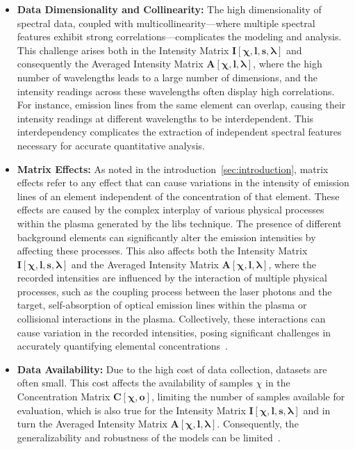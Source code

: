 \begin{itemize}
    \item \textbf{Data Dimensionality and Collinearity:} The high dimensionality of spectral data, coupled with multicollinearity—where multiple spectral features exhibit strong correlations—complicates the modeling and analysis. 
    This challenge arises both in the Intensity Matrix $\mathbf{I[\chi, l, s, \lambda]}$ and consequently the Averaged Intensity Matrix $\mathbf{A[\chi, l, \lambda]}$, where the high number of wavelengths leads to a large number of dimensions, and the intensity readings across these wavelengths often display high correlations.
    For instance, emission lines from the same element can overlap, causing their intensity readings at different wavelengths to be interdependent\cite{andersonImprovedAccuracyQuantitative2017}. 
    This interdependency complicates the extraction of independent spectral features necessary for accurate quantitative analysis.

    \item \textbf{Matrix Effects:} As noted in the introduction~\ref{sec:introduction}, matrix effects refer to any effect that can cause variations in the intensity of emission lines of an element independent of the concentration of that element. 
    These effects are caused by the complex interplay of various physical processes within the plasma generated by the \gls{libs} technique. The presence of different background elements can significantly alter the emission intensities by affecting these processes.
    This also affects both the Intensity Matrix $\mathbf{I[\chi, l, s, \lambda]}$ and the Averaged Intensity Matrix $\mathbf{A[\chi, l, \lambda]}$, where the recorded intensities are influenced by the interaction of multiple physical processes, such as the coupling process between the laser photons and the target, self-absorption of optical emission lines within the plasma or collisional interactions in the plasma.
    Collectively, these interactions can cause variation in the recorded intensities, posing significant challenges in accurately quantifying elemental concentrations~\cite{cleggRecalibrationMarsScience2017, andersonImprovedAccuracyQuantitative2017}.
    
    \item \textbf{Data Availability:} Due to the high cost of data collection, datasets are often small. 
    This cost affects the availability of samples $\chi$ in the Concentration Matrix $\mathbf{C[\chi, o]}$, limiting the number of samples available for evaluation, which is also true for the Intensity Matrix $\mathbf{I[\chi, l, s, \lambda]}$ and in turn the Averaged Intensity Matrix $\mathbf{A[\chi, l, \lambda]}$. 
    Consequently, the generalizability and robustness of the models can be limited~\cite{p9_paper}.
\end{itemize}

